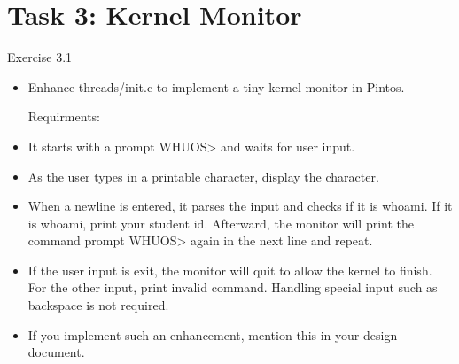 \documentclass[14pt]{beamer}
\begin{document}
\section{Task 3: Kernel Monitor}
\begin{frame}[fragile]{Exercise 3.1}
\begin{itemize}
\small
    \item Enhance threads/init.c to implement a tiny kernel monitor in Pintos.

Requirments:

    \item It starts with a prompt WHUOS> and waits for user input.

\item As the user types in a printable character, display the character.

\item When a newline is entered, it parses the input and checks if it is whoami. If it is whoami, print your student id. Afterward, the monitor will print the command prompt WHUOS> again in the next line and repeat.

\item If the user input is exit, the monitor will quit to allow the kernel to finish. For the other input, print invalid command. Handling special input such as backspace is not required.

\item If you implement such an enhancement, mention this in your design document.

\end{itemize}
\end{frame}
\end{document}
